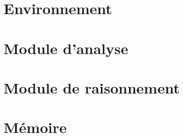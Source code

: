 
\section{Environnement}
\label{section_analyse_environnement}


\section{Module d'analyse}



\section{Module de raisonnement}



\section{Mémoire}

